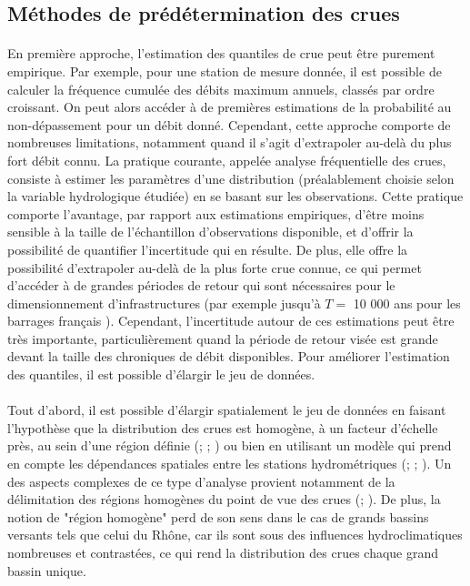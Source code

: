 	\subsection*{Méthodes de prédétermination des crues}
	\label{subsec:méthodes}	
	
	\paragraph{} En première approche, l'estimation des quantiles de crue peut être purement empirique. Par exemple, pour une station de mesure donnée, il est possible de calculer la fréquence cumulée des débits maximum annuels, classés par ordre croissant. On peut alors accéder à de premières estimations de la probabilité au non-dépassement pour un débit donné. Cependant, cette approche comporte de nombreuses limitations, notamment quand il s'agit d'extrapoler au-delà du plus fort débit connu. La pratique courante, appelée analyse fréquentielle des crues, consiste à estimer les paramètres d'une distribution (préalablement choisie selon la variable hydrologique étudiée) en se basant sur les observations. Cette pratique comporte l'avantage, par rapport aux estimations empiriques, d'être moins sensible à la taille de l'échantillon d'observations disponible, et d'offrir la possibilité de quantifier l'incertitude qui en résulte. De plus, elle offre la possibilité d'extrapoler au-delà de la plus forte crue connue, ce qui permet d'accéder à de grandes périodes de retour qui sont nécessaires pour le dimensionnement d'infrastructures (par exemple jusqu'à $T =$ 10 000 ans pour les barrages français \citep{le_delliou_recommandations_2014}). Cependant, l'incertitude autour de ces estimations peut être très importante, particulièrement quand la période de retour visée est grande devant la taille des chroniques de débit disponibles. Pour améliorer l'estimation des quantiles, il est possible d'élargir le jeu de données. 
	
	\paragraph{} Tout d'abord, il est possible d'élargir spatialement le jeu de données en faisant l'hypothèse que la distribution des crues est homogène, à un facteur d'échelle près, au sein d'une région définie (\cite{hosking_regional_1997}; \cite{gaume_bayesian_2010}; \cite{viglione_flood_2013}) ou bien en utilisant un modèle qui prend en compte les dépendances spatiales entre les stations hydrométriques (\cite{kjeldsen_exploratory_2009}; \cite{renard_bayesian_2011}; \cite{sun_general_2014}). Un des aspects complexes de ce type d'analyse provient notamment de la délimitation des régions homogènes du point de vue des crues (\cite{ouarda_regional_2001}; \cite{han_network_2020}). De plus, la notion de "région homogène" perd de son sens dans le cas de grands bassins versants tels que celui du Rhône, car ils sont sous des influences hydroclimatiques nombreuses et contrastées, ce qui rend la distribution des crues chaque grand bassin unique.
	
